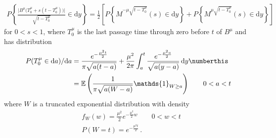 \begin{theorem}
	\begin{align}\label{eq:mdr-repr-thm}
	P\left\{   
	\frac { 
	\Big | B^\mu\Big ( T_0^\mu + s ( t - T_0^\mu) \Big )  \Big |    
	}
	{
	\sqrt{t - T^\mu_0}
	} \in \mathrm d y 
	\right\} = 
	\frac 12 
	\left[
	P\left\{ M^{- \mu \sqrt{ t - T_0^\mu}}(s) \in\mathrm d y \right\} + 
	P\left\{ M^{\mu \sqrt{ t - T_0^\mu}} (s)\in\mathrm d y \right\}  
	\right]
	\end{align}
for $  0< s < 1 $, where $ T_0^\mu $ is the last passage time through zero before $ t $ of $ B^\mu $ and has distribution
%
%
\begin{align*}
P( T _0^\mu \in \mathrm d a) / \mathrm d a &=
\frac{e^{- \frac{\mu^2 t }{2}}}{\pi \sqrt{a (t-a)}} + \frac{\mu^2}{2 \pi} \int_a^t \frac{e^{ - \frac{ \mu^2 a }{2 }}}{\sqrt{a ( y -a )}} 
\, \mathrm d y 
\numberthis 
\\
&=
\mathbb E \left( \frac{1 }{\pi \sqrt{a ( W -a )}} \mathds{1}_{W \geq a } \right) \qquad 0 <a<t
\end{align*}
where $  W  $ is a truncated exponential distribution with density
\begin{align*}
&f_W(w) = \frac{\mu^2}{2} e^{  - \frac{\mu^2}{2} w  } \qquad 0<w<t \\
&P(W = t ) = e^{-\frac{\mu^2 t}{2}}\, .
\end{align*}
\end{theorem}
%
%
